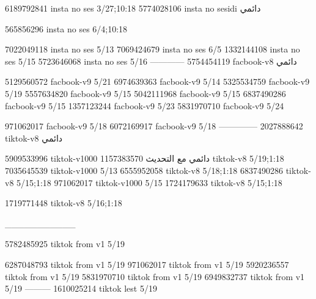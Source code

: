 
6189792841 insta no ses
3/27;10:18
5774028106 insta no sesidi
دائمي


565856296 insta no ses
6/4;10:18


7022049118 insta no ses
5/13
7069424679 insta no ses
6/5
1332144108 insta no ses
5/15
5723646068 insta no ses
5/16
------------
5754454119 facbook-v8
دائمي

5129560572 facbook-v9
5/21
6974639363 facbook-v9
5/14
5325534759 facbook-v9
5/19
5557634820 facbook-v9
5/15
5042111968 facbook-v9
5/15
6837490286 facbook-v9
5/15
1357123244 facbook-v9
5/23
5831970710 facbook-v9
5/24

971062017 facbook-v9
5/18
6072169917 facbook-v9
5/18
--------------
2027888642 tiktok-v8
دائمي

5909533996 tiktok-v1000
دائمي مع التحديث
1157383570 tiktok-v8
5/19;1:18
7035645539 tiktok-v1000
5/13
6555952058 tiktok-v8
5/18;1:18
6837490286 tiktok-v8
5/15;1:18
971062017 tiktok-v1000
5/15
1724179633 tiktok-v8
5/15;1:18

1719771448 tiktok-v8
5/16;1:18


___________

5782485925 tiktok from v1
5/19

6287048793 tiktok from v1
5/19
971062017 tiktok from v1
5/19
5920236557 tiktok from v1
5/19
5831970710 tiktok from v1
5/19
6949832737 tiktok from v1
5/19
---------
1610025214 tiktok lest
5/19
